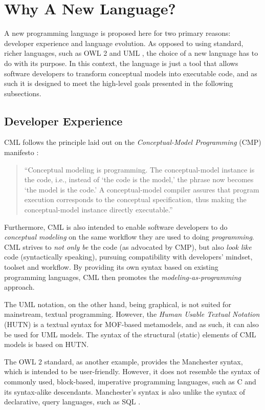 \section{Why A New Language?}\label{sec:why}

A new programming language is proposed here for two primary reasons:
developer experience and language evolution.
As opposed to using standard, richer languages,
such as OWL 2 \cite{owl2} and UML \cite{uml},
the choice of a new language has to do with its purpose.
In this context, the language is just a tool
that allows software developers to transform conceptual models into executable code,
and as such it is designed to meet the high-level goals presented in the following subsections.

\subsection{Developer Experience}

CML follows the principle laid out on the \emph{Conceptual-Model Programming} (CMP) manifesto \cite{cmp}:

\begin{quote}
``Conceptual modeling is programming.
The conceptual-model instance is the code,
i.e., instead of `the code is the model,'
the phrase now becomes `the model is the code.'
A conceptual-model compiler assures that program execution corresponds to the conceptual specification,
thus making the conceptual-model instance directly executable.''
\end{quote}

Furthermore,
CML is also intended to enable software developers to do \emph{conceptual modeling} on the same workflow they are used to doing \emph{programming}.
CML strives to \emph{not only be} the code (as advocated by CMP),
but also \emph{look like} code (syntactically speaking),
pursuing compatibility with developers' mindset, toolset and workflow.
By providing its own syntax based on existing programming languages,
CML then promotes the \emph{modeling-as-programming} approach. 

The UML \cite{uml} notation, on the other hand,
being graphical,
is not suited for mainstream, textual programming.
However, the \emph{Human Usable Textual Notation} (HUTN) \cite{hutn} is a textual syntax for MOF-based \cite{mof} metamodels,
and as such, it can also be used for UML models.
The syntax of the structural (static) elements of CML models is based on HUTN.

The OWL 2 standard, as another example, provides the Manchester \cite{owl2manchester} syntax,
which is intended to be user-friendly.
However, it does not resemble the syntax of commonly used, block-based, imperative programming languages,
such as C \cite{clang} and its syntax-alike descendants.
Manchester's syntax is also unlike the syntax of declarative, query languages, such as SQL \cite{sql}.

